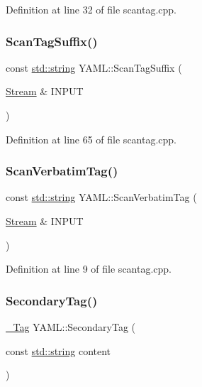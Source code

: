 Definition at line 32 of file scantag.\+cpp.

\mbox{\label{namespace_y_a_m_l_a8d9ae9b29f649097b151c9368b526687}} 
\subsubsection{\texorpdfstring{ScanTagSuffix()}{ScanTagSuffix()}}
{\footnotesize\ttfamily const \mbox{\hyperlink{glad_8h_ac83513893df92266f79a515488701770}{std\+::string}} Y\+A\+M\+L\+::\+Scan\+Tag\+Suffix (\begin{DoxyParamCaption}\item[{\mbox{\hyperlink{class_y_a_m_l_1_1_stream}{Stream}} \&}]{I\+N\+P\+UT }\end{DoxyParamCaption})}



Definition at line 65 of file scantag.\+cpp.

\mbox{\label{namespace_y_a_m_l_a33a2f180601529f6e4143a7f7302b922}} 
\subsubsection{\texorpdfstring{ScanVerbatimTag()}{ScanVerbatimTag()}}
{\footnotesize\ttfamily const \mbox{\hyperlink{glad_8h_ac83513893df92266f79a515488701770}{std\+::string}} Y\+A\+M\+L\+::\+Scan\+Verbatim\+Tag (\begin{DoxyParamCaption}\item[{\mbox{\hyperlink{class_y_a_m_l_1_1_stream}{Stream}} \&}]{I\+N\+P\+UT }\end{DoxyParamCaption})}



Definition at line 9 of file scantag.\+cpp.

\mbox{\label{namespace_y_a_m_l_a95e86040e490f096ee981454e1a34a35}} 
\subsubsection{\texorpdfstring{SecondaryTag()}{SecondaryTag()}}
{\footnotesize\ttfamily \mbox{\hyperlink{struct_y_a_m_l_1_1___tag}{\+\_\+\+Tag}} Y\+A\+M\+L\+::\+Secondary\+Tag (\begin{DoxyParamCaption}\item[{const \mbox{\hyperlink{glad_8h_ac83513893df92266f79a515488701770}{std\+::string}}}]{content }\end{DoxyParamCaption})\hspace{0.3cm}{\ttfamily [inline]}}



